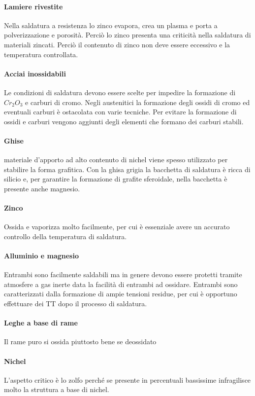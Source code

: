 \paragraph{Lamiere rivestite}
Nella saldatura a resistenza lo zinco evapora, crea un plasma e porta a polverizzazione e porosità.
Perciò lo zinco presenta una criticità nella saldatura di materiali zincati. Perciò il contenuto di zinco non deve essere eccessivo e la temperatura controllata.
\paragraph{Acciai inossidabili}
Le condizioni di saldatura devono essere scelte per impedire la formazione di $Cr_2O_3$ e carburi di cromo.
Negli austenitici la formazione degli ossidi di cromo ed eventuali carburi è ostacolata con varie tecniche.
Per evitare la formazione di ossidi e carburi vengono aggiunti degli elementi che formano dei carburi stabili.
\paragraph{Ghise} materiale d'apporto ad alto contenuto di nichel viene spesso utilizzato per stabilire la forma grafitica.
Con la ghisa grigia la bacchetta di saldatura è ricca di silicio e, per garantire la formazione di grafite sferoidale, nella bacchetta è presente anche magnesio.
\paragraph{Zinco} Ossida e vaporizza molto facilmente, per cui è essenziale avere un accurato controllo della temperatura di saldatura.
\paragraph{Alluminio e magnesio} Entrambi sono facilmente saldabili ma in genere devono essere protetti tramite atmosfere a gas inerte data la facilità di entrambi ad ossidare. Entrambi sono caratterizzati dalla formazione di ampie tensioni residue, per cui è opportuno effettuare dei \ac{TT} dopo il processo di saldatura.
\paragraph{Leghe a base di rame} Il rame puro si ossida piuttosto bene se deossidato
\paragraph{Nichel} L'aspetto critico è lo zolfo perché se presente in percentuali bassissime infragilisce molto la struttura a base di nichel.
